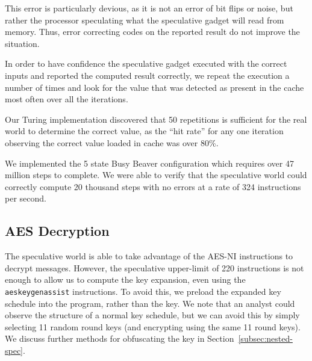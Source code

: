 This error is particularly devious, as it is not an
error of bit flips or noise, but rather the processor speculating what the
speculative gadget will read from memory. Thus, error correcting codes on
the reported result do not improve the situation.



In order to have confidence the speculative gadget executed with the
correct inputs and reported the computed result correctly, 
we repeat the execution a number of times and look for the value that was
detected as present in the cache most often over all the iterations.

Our Turing implementation discovered that 50 repetitions is sufficient for
the real world to determine the correct value, as the ``hit rate'' for any one
iteration observing the correct value loaded in cache was over 80\%.

We implemented the 5 state Busy Beaver configuration which requires over 47
million steps to complete. We were able to verify that the speculative world
could correctly compute 20 thousand steps with no errors at a rate of 324 instructions per second.



\subsection{AES Decryption}
\label{subsec:impl-aes}
The speculative world is able to take advantage of the AES-NI instructions to
decrypt messages. However, the speculative upper-limit of 220 instructions is not
enough to allow us to compute the key expansion, even using the
\texttt{aeskeygenassist} instructions. To avoid this, we preload the expanded
key schedule into the program, rather than the key. We note that an analyst
could observe the structure of a normal key schedule,
but we can avoid this by simply selecting 11 random round keys (and encrypting
using the same 11 round keys). We discuss further methods for obfuscating
the key in Section~\ref{subsec:nested-spec}.


